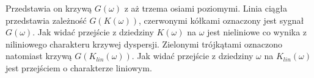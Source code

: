 Przedstawia on krzywą $G(\omega)$ z aż trzema osiami poziomymi. Linia ciągła przedstawia zależność $G(K(\omega))$, czerwonymi kółkami oznaczony jest sygnał $G(\omega)$. Jak widać przejście z dziedziny $K(\omega)$ na $\omega$ jest nieliniowe co wynika z niliniowego charakteru krzywej dyspersji. Zielonymi trójkątami oznaczono natomiast krzywą $G(K_{lin}(\omega))$. Jak widać przejście z dziedziny $\omega$ na $K_{lin}(\omega)$ jest przejściem o charakterze liniowym. 
